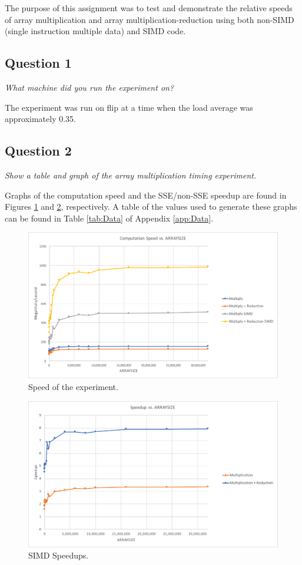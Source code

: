 \documentclass{article}
\begin{document}
The purpose of this assignment was to test and demonstrate the relative speeds of array multiplication and array multiplication-reduction using both non-SIMD (single instruction multiple data) and SIMD code.

\subsection*{Question 1}
\textit{What machine did you run the experiment on?}

The experiment was run on flip at a time when the load average was approximately 0.35.

\subsection*{Question 2}
\textit{Show a table and graph of the array multiplication timing experiment.}

Graphs of the computation speed and the SSE/non-SSE speedup are found in Figures \ref{fig:Speed} and \ref{fig:Speedup}, respectively.  A table of the values used to generate these graphs can be found in Table \ref{tab:Data} of Appendix \ref{app:Data}.

\begin{figure}[h]
	\centering
        \includegraphics[width=0.7\linewidth]{Speeds.pdf}
        \caption{Speed of the experiment.}
        \label{fig:Speed}
\end{figure}

\begin{figure}[h]
	\centering
        \includegraphics[width=0.7\linewidth]{Speedup.pdf}
        \caption{SIMD Speedups.}
        \label{fig:Speedup}
\end{figure}
\end{document}
